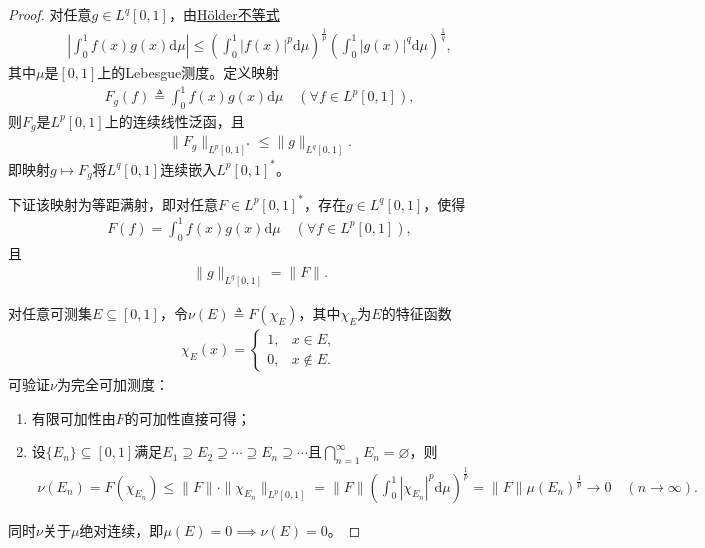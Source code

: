 \documentclass[../../main.tex]{subfiles}%
\begin{document}
\begin{proof}

对任意$g\in L^q[0,1]$，由\hyperref[Real-Analysis-theorem:实变函数--Hölder不等式]{Hölder不等式}
\begin{align*}
\left|\int_{0}^{1}f(x)g(x)\mathrm{d}\mu\right|\leqslant\left(\int_{0}^{1}|f(x)|^p\mathrm{d}\mu\right)^{\frac{1}{p}}\left(\int_{0}^{1}|g(x)|^q\mathrm{d}\mu\right)^{\frac{1}{q}},
\end{align*}
其中$\mu$是$[0,1]$上的Lebesgue测度。定义映射
\begin{align}
F_g(f)\triangleq\int_{0}^{1}f(x)g(x)\mathrm{d}\mu\quad(\forall f\in L^p[0,1]),\label{eq:fgmap}
\end{align}
则$F_g$是$L^p[0,1]$上的连续线性泛函，且
\begin{align}
\|F_g\|_{L^p[0,1]^*}\leqslant\|g\|_{L^q[0,1]}.\label{eq:fnormbound}
\end{align}
即映射$g\mapsto F_g$将$L^q[0,1]$连续嵌入$L^p[0,1]^*$。

下证该映射为等距满射，即对任意$F\in L^p[0,1]^*$，存在$g\in L^q[0,1]$，使得
\begin{align}
F(f)=\int_{0}^{1}f(x)g(x)\mathrm{d}\mu\quad(\forall f\in L^p[0,1]),\label{eq:frep}
\end{align}
且
\begin{align}
\|g\|_{L^q[0,1]}=\|F\|.\label{eq:gnormeqf}
\end{align}

对任意可测集$E\subseteq[0,1]$，令$\nu(E)\triangleq F(\chi_E)$，其中$\chi_E$为$E$的特征函数
\begin{align*}
\chi_E(x)=
\begin{cases}
1,& x\in E,\\
0,& x\notin E.
\end{cases}
\end{align*}
可验证$\nu$为完全可加测度：
\begin{enumerate}[(1)]
\item 有限可加性由$F$的可加性直接可得；
\item 设$\{E_n\}\subseteq[0,1]$满足$E_1\supseteq E_2\supseteq\cdots\supseteq E_n\supseteq\cdots$且$\bigcap\limits_{n=1}^{\infty}E_n=\varnothing $，则
\begin{align*}
\nu(E_n)=F(\chi_{E_n})\leqslant\|F\|\cdot\|\chi_{E_n}\|_{L^p[0,1]}
=\|F\|\left(\int_{0}^{1}|\chi_{E_n}|^p\mathrm{d}\mu\right)^{\frac{1}{p}}
=\|F\|\mu(E_n)^{\frac{1}{p}}\to0\quad(n\to\infty).
\end{align*}
\end{enumerate}
同时$\nu$关于$\mu$绝对连续，即$\mu(E)=0\implies\nu(E)=0$。


\end{proof}
\end{document}
